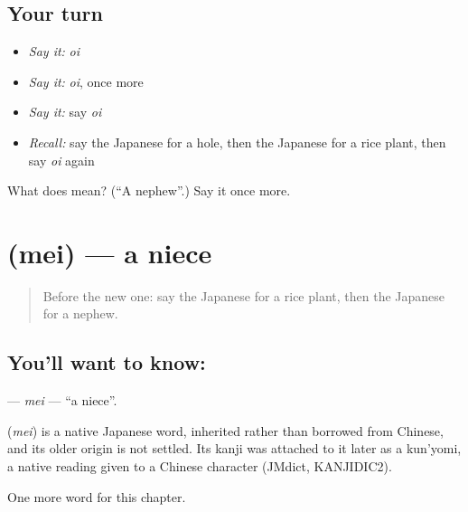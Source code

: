 \subsection*{Your turn}
\begin{itemize}
\raggedright
  \item \emph{Say it:} \emph{oi}
  \item \emph{Say it:} \emph{oi}, once more
  \item \emph{Say it:} say \emph{oi}
  \item \emph{Recall:} say the Japanese for a hole, then the Japanese for a rice plant, then say \emph{oi} again
\end{itemize}

\begin{tcolorbox}[breakable,colback=teal!4,colframe=teal!35!black,title={Before you move on}]
What does  mean? (\textquotedblleft{}A nephew\textquotedblright{}.) Say it once more.
\end{tcolorbox}
\section[\texorpdfstring{\ja{めい} (mei)}{めい (mei)}]{ (mei) — a niece}

\label{lesson:JA-C71-mei}



\begin{quote}
Before the new one: say the Japanese for a rice plant, then the Japanese for a nephew.
\end{quote}

\subsection*{You'll want to know: }
\textbf{} — \emph{mei} — \textquotedblleft{}a niece\textquotedblright{}.

\begin{cousinweb}
\textbf{} (\emph{mei}) is a native Japanese word, inherited rather than borrowed from Chinese, and its older origin is not settled. Its kanji was attached to it later as a kun'yomi, a native reading given to a Chinese character (JMdict, KANJIDIC2).
\end{cousinweb}

\begin{grammarlens}[title={What you've built}]
One more word for this chapter.
\end{grammarlens}

